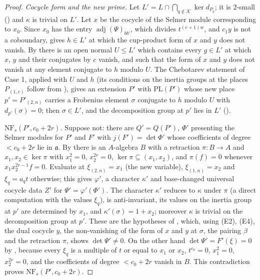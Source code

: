 \begin{proof}
\emph{Cocycle form and the new prime.} Let $L'=L\cap\bigcap_{q\notin\mathcal K}\ker d_{P_q}$; it is $2$-small
() and $\kappa$ is trivial on $L'$. Let $x$ be the cocycle of the Selmer module
corresponding to $x_0$. Since $x_0$ has the entry $\operatorname{adj}(\Psi)_{bb'}$, which divides $t^{(e+1)w}$, and $c_1y$ is not a coboundary,
 gives $h\in L'$ at which the cup-product form of $x$
and $y$ does not vanish. By  there is an open normal
$U\le L'$ which contains every $g\in L'$ at which $x$, $y$ and their conjugates by $c$ vanish, and such that the form of $x$
and $y$ does not vanish at any element conjugate to $h$ modulo $U$.
The Chebotarev statement of Case 1, applied with $U$ and $h$ (its conditions on the inertia groups at the places $P_{(1,c)}$
follow from ), gives an extension $P'$ with
$\mathrm{PL}(P')$ whose new place $p'=P'_{(2,n)}$ carries a Frobenius element $\sigma$ conjugate to $h$ modulo $U$ with
$d_{p'}(\sigma)=0$; then $\sigma\in L'$, and the decomposition group at $p'$ lies in $L'$
().

\emph{$\mathrm{NF}_s(P',c_0+2r)$.} Suppose not: there are $Q'=Q(P')$, $\Phi'$ presenting the Selmer modules for $P'$ and $F'$ with
$j(F')=\det\Phi'$ whose coefficients of degree $<c_0+2r$ lie in $\mathfrak a$. By
 there is an $A$-algebra $B$ with a retraction $\pi\colon B\to A$
and $x_1,x_2\in\ker\pi$ with $x_1^2=0$, $x_2^{2r}=0$, $\ker\pi\subseteq(x_1,x_2)$, and $\pi(f)=0$ whenever $x_1x_2^{2r-1}f=0$.
Evaluate at $\xi_{(2,n)}=x_1$ (the new variable), $\xi_{(1,n)}=x_2$ and $\xi_q=a_qt$ otherwise; this gives $\varphi'$, a character
$\kappa'$ and base-changed universal cocycle data $Z'$ for $\Psi'=\varphi'(\Phi')$. The character $\kappa'$ reduces to $\kappa$ under
$\pi$ (a direct computation with the values $\xi_q$), is anti-invariant, its values on the inertia group at $p'$ are
determined by $x_1$, and $\kappa'(\sigma)=1+x_2$; moreover $\kappa$ is trivial on the decomposition group at $p'$. These are the
hypotheses of , which, using (E2), (E4), the dual cocycle $y$, the
non-vanishing of the form of $x$ and $y$ at $\sigma$, the pairing $\beta$ and the retraction $\pi$, shows $\det\Psi'\ne0$. On the other hand
$\det\Psi'=F'(\xi)=0$ by , because every $\xi_q$ is a
multiple of $t$ or equal to $x_1$ or $x_2$, $t^{c_0}=0$, $x_1^2=0$, $x_2^{2r}=0$, and the coefficients of degree $<c_0+2r$ vanish in
$B$. This contradiction proves $\mathrm{NF}_s(P',c_0+2r)$.
\end{proof}

